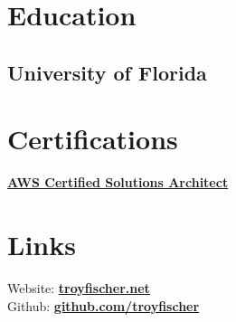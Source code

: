 \documentclass[letterpaper]{deedy-resume}
\date{}
\title{}
\begin{document}




\begin{minipage}[t]{0.33\textwidth} %


\section{Education}
\subsection{University of Florida}

\sectionspace %

\section{Certifications}
\href{https://www.credly.com/badges/6cfa3e1d-b75e-4a53-a16b-acdf66ca04e3/public_url}{\underline{\textbf{AWS Certified Solutions Architect}}}

\sectionspace


\section{Links}
Website: \href{https://troyfischer.net}{\underline{\textbf{troyfischer.net}}} \\
Github: \href{https://github.com/troyfischer}{\underline{\textbf{github.com/troyfischer}}} \\
\sectionspace


\end{minipage}
\end{document}
